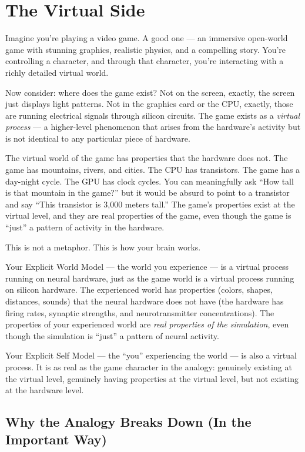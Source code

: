 \documentclass[11pt, twoside, openright]{book}
\begin{document}
\chapter{The Virtual Side}

Imagine you're playing a video game. A good one --- an immersive open-world game with stunning graphics, realistic physics, and a compelling story. You're controlling a character, and through that character, you're interacting with a richly detailed virtual world.

Now consider: where does the game exist? Not on the screen, exactly, the screen just displays light patterns. Not in the graphics card or the CPU, exactly, those are running electrical signals through silicon circuits. The game exists as a \textit{virtual process} --- a higher-level phenomenon that arises from the hardware's activity but is not identical to any particular piece of hardware.

The virtual world of the game has properties that the hardware does not. The game has mountains, rivers, and cities. The CPU has transistors. The game has a day-night cycle. The GPU has clock cycles. You can meaningfully ask ``How tall is that mountain in the game?'' but it would be absurd to point to a transistor and say ``This transistor is 3,000 meters tall.'' The game's properties exist at the virtual level, and they are real properties of the game, even though the game is ``just'' a pattern of activity in the hardware.

This is not a metaphor. This is how your brain works.

Your Explicit World Model --- the world you experience --- is a virtual process running on neural hardware, just as the game world is a virtual process running on silicon hardware. The experienced world has properties (colors, shapes, distances, sounds) that the neural hardware does not have (the hardware has firing rates, synaptic strengths, and neurotransmitter concentrations). The properties of your experienced world are \textit{real properties of the simulation}, even though the simulation is ``just'' a pattern of neural activity.

Your Explicit Self Model --- the ``you'' experiencing the world --- is also a virtual process. It is as real as the game character in the analogy: genuinely existing at the virtual level, genuinely having properties at the virtual level, but not existing at the hardware level.

\section*{Why the Analogy Breaks Down (In the Important Way)}
\end{document}
